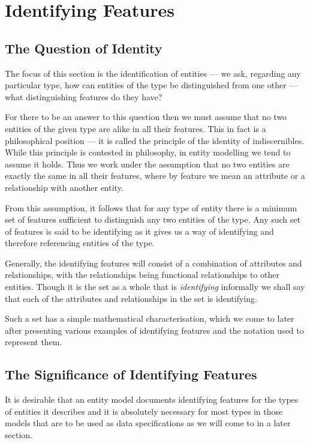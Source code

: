 \section{Identifying Features}
\label{IdentifyingFeatures}
\subsection{The Question of Identity}
\mynote
The focus of this section is the identification of entities ---  we ask, regarding any particular type, how can entities of the type be distinguished from one other 
--- what distinguishing features do they have? 

For there to be an answer to this question then we must assume that no two entities of the given type are alike in all their features. This in fact  is a philosophical position 
--- it is called the principle of the identity of indiscernibles. 
While this principle is contested in philosophy, in entity modelling we tend to assume it holds.
Thus we work under the assumption that no two entities are exactly the same in all their features, where by feature we mean an attribute or a relationship with another entity. 

From this assumption, it follows that for any type of entity there is a minimum set of features sufficient to distinguish any two entities of the type. Any such set of features is said to be identifying as it gives us a way of identifying and therefore referencing entities of the type. 

 Generally, 
 the identifying features will consist of a combination of attributes and relationships, 
 with the relationships being functional relationships to other entities. 
Though it is the set as a whole that is \textit{identifying} 
informally we shall say that each of the attributes and relationships in the set is identifying. 

Such a set has a simple mathematical characterisation, which we come to later after presenting various
examples  of identifying features and the notation used to represent them.

\subsection{The Significance of Identifying Features}

\mynote 
It is desirable that an entity model documents identifying features for the types of entities it describes and  it is  absolutely necessary for most types in those models that are to be used as data specifications as we will come to in a later section. 

